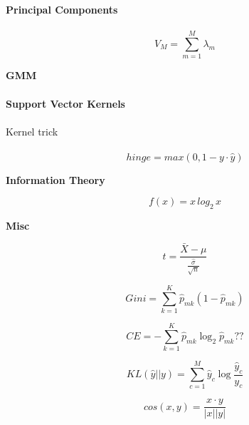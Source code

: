\documentclass[11pt]{article}
\begin{document}
\begin{minipage}[t]{.33333\textwidth}


\textbf{Principal Components}
\\\\

\begin{equation*}
	V_M = \sum_{m=1}^{M}\lambda_m
\end{equation*}

\textbf{GMM}
\\\\
\textbf{Support Vector Kernels}
\\\\
Kernel trick
\\\\

\begin{equation*}
hinge = max(0, 1 - y \cdot \hat{y})
\end{equation*}

\textbf{Information Theory}


\begin{equation*}
	f(x) = x\,log_2\,x
\end{equation*}

\textbf{Misc}

\begin{equation*}
	t = \frac{\bar{X} - \mu}{\frac{\hat{\sigma}}{\sqrt{n}}}
\end{equation*}


\begin{equation*}
	Gini = \sum_{k=1}^{K}\hat{p}_{mk}(1-\hat{p}_{mk})
\end{equation*}

\begin{equation*}
	CE = -\sum_{k=1}^{K}\hat{p}_{mk}\log _2 \hat{p}_{mk} ??
\end{equation*}

%

\begin{equation*}
KL(\hat{y} || y) = \sum_{c=1}^{M}\hat{y}_c \log{\frac{\hat{y}_c}{y_c}}
\end{equation*}

\begin{equation*}
cos(x,y) = \frac{x \cdot y}{|x||y|}
\end{equation*}

\end{minipage}
\end{document}
